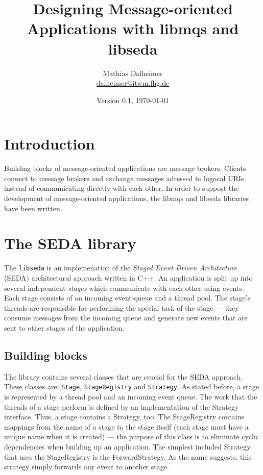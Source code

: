\documentclass[11pt]{article}
\title{\textsf{Designing Message-oriented Applications with libmqs and
libseda}}
\author{ Mathias Dalheimer\\
\url{dalheimer@itwm.fhg.de}}
\date{Version 0.1, \today\\
}
\begin{document}
\ifpdf
{}
\else
{}
\fi

\maketitle


\tableofcontents

\section{Introduction}\label{sec:introduction}
Building  blocks  of message-oriented  applications  are message  brokers.
Clients  connect to  message  brokers and  exchange  messages adressed  to
logocal URIs instead  of communicating directly with each  other. In order
to support  the development  of message-oriented applications,  the libmqs
and libseda libraries have been written.

\section{The SEDA library}\label{sec:libseda}
The \verb|libseda|  is an implemenation  of the \emph{Staged  Event Driven
  Architecture} (SEDA) architectural approach \cite{seda-approach} written
in C++.  An application is split up into several independent \emph{stages}
which communicate with each other using events.  Each stage consists of an
incoming  event-queue  and  a   thread  pool.   The  stage's  threads  are
responsible for performing the special  task of the stage --- they consume
messages from the incoming queue and  generate new events that are sent to
other stages of the application.

\subsection{Building blocks}
\label{sec:libseda:building-blocks}

The  library  contains several  classes  that  are  crucial for  the  SEDA
approach.   These  classes  are:  \verb|Stage|,  \verb|StageRegistry|  and
\verb|Strategy|.  As  stated before,  a stage is  represented by  a thread
pool and  an incoming event  queue. The work  that the threads of  a stage
perform is defined by an implementation of the Strategy interface. Thus, a
stage contains  a Strategy, too. The StageRegistry  contains mappings from
the name  of a stage to  the stage itself  (each stage must have  a unique
name when  it is created)  --- the purpose  of this class is  to eliminate
cyclic dependencies when building up an application. The simplest included
Strategy that uses the StageRegistry  is the ForwardStrategy.  As the name
suggests, this strategy simply forwards any event to another stage.
\end{document}
